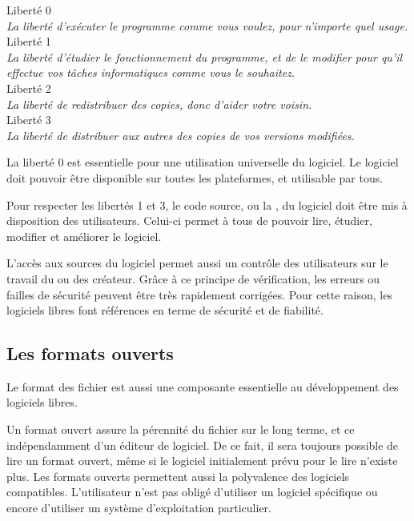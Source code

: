 \begin{center}
\begin{minipage}{0.8\textwidth}
\begin{center}
\textcolor{Cdl}{\large Liberté 0} \\ \textit{La liberté d'exécuter le programme comme vous voulez, pour n'importe quel usage.} \\
\textcolor{Cdl}{\large Liberté 1} \\ \textit{La liberté d'étudier le fonctionnement du programme, et de le modifier pour qu'il effectue vos tâches informatiques comme vous le souhaitez.} \\
\textcolor{Cdl}{\large Liberté 2} \\ \textit{La liberté de redistribuer des copies, donc d'aider votre voisin.} \\
\textcolor{Cdl}{\large Liberté 3} \\ \textit{La liberté de distribuer aux autres des copies de vos versions modifiées.}
\end{center}
\end{minipage}
\end{center}

La \textcolor{Cdl}{liberté 0} est essentielle pour une utilisation universelle du logiciel. Le logiciel doit pouvoir être disponible sur toutes les plateformes, et utilisable par tous.

\Separateur

Pour respecter les \textcolor{Cdl}{libertés 1 et 3}, le code source, ou la , du logiciel doit être mis à disposition des utilisateurs. Celui-ci permet à tous de pouvoir lire, étudier, modifier et améliorer le logiciel.

\Separateur

L’accès aux \textcolor{Cdl}{sources} du logiciel permet aussi un contrôle des utilisateurs sur le travail du ou des créateur. Grâce à ce principe de vérification, les erreurs ou failles de sécurité peuvent être très rapidement corrigées. Pour cette raison, les logiciels libres font références en terme de sécurité et de fiabilité.

\subsection{Les formats ouverts}

Le format des fichier est aussi une composante essentielle au développement des logiciels libres.

Un \textcolor{Cdl}{format ouvert} assure la pérennité du fichier sur le long terme, et ce indépendamment d’un éditeur de logiciel. De ce fait, il sera toujours possible de lire un format ouvert, même si le logiciel initialement prévu pour le lire n’existe plus. Les formats ouverts permettent aussi la polyvalence des logiciels compatibles. L’utilisateur n’est pas obligé d’utiliser un logiciel spécifique ou encore d’utiliser un système d’exploitation particulier.

